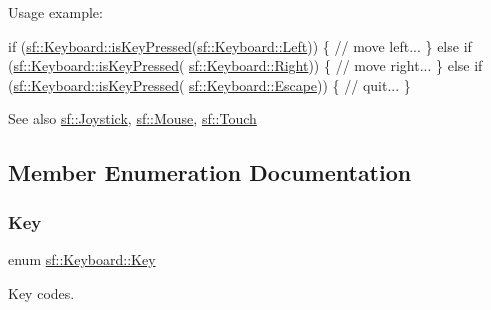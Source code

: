 Usage example\+: 
\begin{DoxyCode}
\textcolor{keywordflow}{if} (\hyperlink{classsf_1_1_keyboard_a80a04b2f53005886957f49eee3531599}{sf::Keyboard::isKeyPressed}(\hyperlink{classsf_1_1_keyboard_acb4cacd7cc5802dec45724cf3314a142ac3fe5df11d15b57317c053a2ae13d9a9}{sf::Keyboard::Left}))
\{
    \textcolor{comment}{// move left...}
\}
\textcolor{keywordflow}{else} \textcolor{keywordflow}{if} (\hyperlink{classsf_1_1_keyboard_a80a04b2f53005886957f49eee3531599}{sf::Keyboard::isKeyPressed}(
      \hyperlink{classsf_1_1_keyboard_acb4cacd7cc5802dec45724cf3314a142a2aeb083dea103a8e36b6850b51ef3632}{sf::Keyboard::Right}))
\{
    \textcolor{comment}{// move right...}
\}
\textcolor{keywordflow}{else} \textcolor{keywordflow}{if} (\hyperlink{classsf_1_1_keyboard_a80a04b2f53005886957f49eee3531599}{sf::Keyboard::isKeyPressed}(
      \hyperlink{classsf_1_1_keyboard_acb4cacd7cc5802dec45724cf3314a142a64b7ecb543c5d03bec8383dde123c95d}{sf::Keyboard::Escape}))
\{
    \textcolor{comment}{// quit...}
\}
\end{DoxyCode}


\begin{DoxySeeAlso}{See also}
\hyperlink{classsf_1_1_joystick}{sf\+::\+Joystick}, \hyperlink{classsf_1_1_mouse}{sf\+::\+Mouse}, \hyperlink{classsf_1_1_touch}{sf\+::\+Touch} 
\end{DoxySeeAlso}


\subsection{Member Enumeration Documentation}
\mbox{\label{classsf_1_1_keyboard_acb4cacd7cc5802dec45724cf3314a142}} 
\subsubsection{\texorpdfstring{Key}{Key}}
{\footnotesize\ttfamily enum \hyperlink{classsf_1_1_keyboard_acb4cacd7cc5802dec45724cf3314a142}{sf\+::\+Keyboard\+::\+Key}}



Key codes. 

